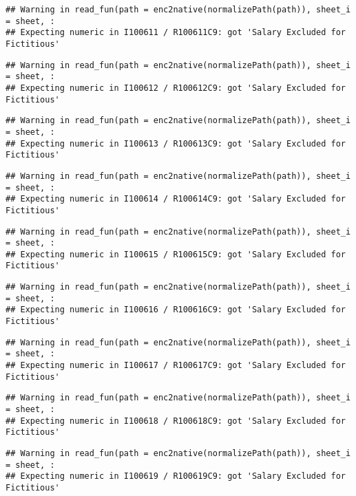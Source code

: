 \documentclass[
]{article}
\begin{document}
\begin{verbatim}
## Warning in read_fun(path = enc2native(normalizePath(path)), sheet_i = sheet, :
## Expecting numeric in I100611 / R100611C9: got 'Salary Excluded for Fictitious'
\end{verbatim}

\begin{verbatim}
## Warning in read_fun(path = enc2native(normalizePath(path)), sheet_i = sheet, :
## Expecting numeric in I100612 / R100612C9: got 'Salary Excluded for Fictitious'
\end{verbatim}

\begin{verbatim}
## Warning in read_fun(path = enc2native(normalizePath(path)), sheet_i = sheet, :
## Expecting numeric in I100613 / R100613C9: got 'Salary Excluded for Fictitious'
\end{verbatim}

\begin{verbatim}
## Warning in read_fun(path = enc2native(normalizePath(path)), sheet_i = sheet, :
## Expecting numeric in I100614 / R100614C9: got 'Salary Excluded for Fictitious'
\end{verbatim}

\begin{verbatim}
## Warning in read_fun(path = enc2native(normalizePath(path)), sheet_i = sheet, :
## Expecting numeric in I100615 / R100615C9: got 'Salary Excluded for Fictitious'
\end{verbatim}

\begin{verbatim}
## Warning in read_fun(path = enc2native(normalizePath(path)), sheet_i = sheet, :
## Expecting numeric in I100616 / R100616C9: got 'Salary Excluded for Fictitious'
\end{verbatim}

\begin{verbatim}
## Warning in read_fun(path = enc2native(normalizePath(path)), sheet_i = sheet, :
## Expecting numeric in I100617 / R100617C9: got 'Salary Excluded for Fictitious'
\end{verbatim}

\begin{verbatim}
## Warning in read_fun(path = enc2native(normalizePath(path)), sheet_i = sheet, :
## Expecting numeric in I100618 / R100618C9: got 'Salary Excluded for Fictitious'
\end{verbatim}

\begin{verbatim}
## Warning in read_fun(path = enc2native(normalizePath(path)), sheet_i = sheet, :
## Expecting numeric in I100619 / R100619C9: got 'Salary Excluded for Fictitious'
\end{verbatim}
\end{document}
